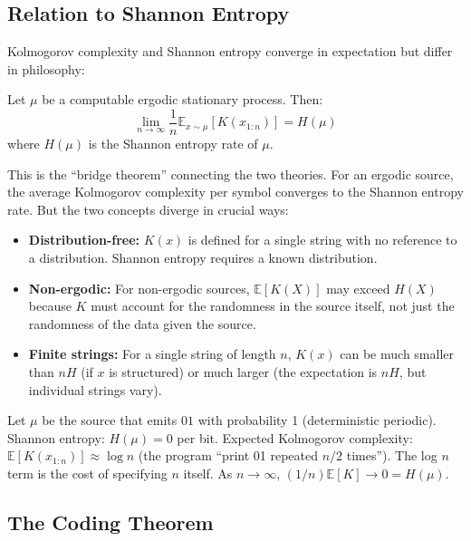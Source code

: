 \subsection{Relation to Shannon Entropy}
\label{sec:kolmogorov:shannon}

Kolmogorov complexity and Shannon entropy converge in expectation but differ in philosophy:

\begin{theorem}
Let $\mu$ be a computable ergodic stationary process. Then:
\[
\lim_{n\to\infty} \frac{1}{n} \mathbb{E}_{x \sim \mu}[K(x_{1:n})] = H(\mu)
\]
where $H(\mu)$ is the Shannon entropy rate of $\mu$.
\end{theorem}

This is the ``bridge theorem'' connecting the two theories. For an ergodic source, the average Kolmogorov complexity per symbol converges to the Shannon entropy rate. But the two concepts diverge in crucial ways:

\begin{itemize}
\item \textbf{Distribution-free:} $K(x)$ is defined for a single string with no reference to a distribution. Shannon entropy requires a known distribution.
\item \textbf{Non-ergodic:} For non-ergodic sources, $\mathbb{E}[K(X)]$ may exceed $H(X)$ because $K$ must account for the randomness in the source itself, not just the randomness of the data given the source.
\item \textbf{Finite strings:} For a single string of length $n$, $K(x)$ can be much smaller than $n H$ (if $x$ is structured) or much larger (the expectation is $nH$, but individual strings vary).
\end{itemize}

\begin{example}
Let $\mu$ be the source that emits $01$ with probability 1 (deterministic periodic). Shannon entropy: $H(\mu) = 0$ per bit. Expected Kolmogorov complexity: $\mathbb{E}[K(x_{1:n})] \approx \log n$ (the program ``print 01 repeated $n/2$ times''). The log $n$ term is the cost of specifying $n$ itself. As $n\to\infty$, $(1/n)\mathbb{E}[K] \to 0 = H(\mu)$.
\end{example}

\subsection{The Coding Theorem}
\label{sec:kolmogorov:coding}

